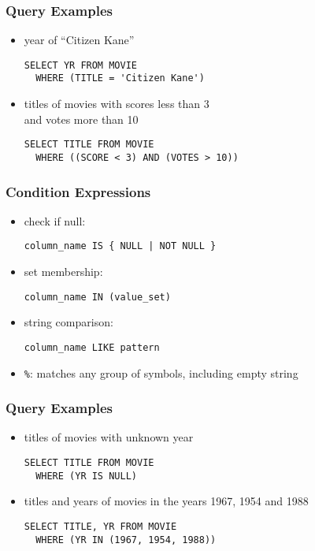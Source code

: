 \documentclass[dvipsnames]{beamer}
\theoremstyle{plain}
\begin{document}
\begin{frame}[fragile]
  \frametitle{Query Examples}

  \begin{itemize}
    \item year of ``Citizen Kane''
    \begin{lstlisting}
SELECT YR FROM MOVIE
  WHERE (TITLE = 'Citizen Kane')
    \end{lstlisting}

    \pause
    \item titles of movies with scores less than 3\\
      and votes more than 10
    \begin{lstlisting}
SELECT TITLE FROM MOVIE
  WHERE ((SCORE < 3) AND (VOTES > 10))
    \end{lstlisting}
  \end{itemize}
\end{frame}

\begin{frame}[fragile]
  \frametitle{Condition Expressions}

  \begin{itemize}
    \item check if null:\\
    \begin{lstlisting}
column_name IS { NULL | NOT NULL }
    \end{lstlisting}

    \pause
    \medskip
    \item set membership:\\
    \begin{lstlisting}
column_name IN (value_set)
    \end{lstlisting}

    \pause
    \medskip
    \item string comparison:
    \begin{lstlisting}
column_name LIKE pattern
    \end{lstlisting}
    \item \lstinline!%!: matches any group of symbols, including empty string
  \end{itemize}
\end{frame}

\begin{frame}[fragile]
  \frametitle{Query Examples}

  \begin{itemize}
    \item titles of movies with unknown year
    \begin{lstlisting}
SELECT TITLE FROM MOVIE
  WHERE (YR IS NULL)
    \end{lstlisting}

    \pause
    \item titles and years of movies in the years 1967, 1954 and 1988
    \begin{lstlisting}
SELECT TITLE, YR FROM MOVIE
  WHERE (YR IN (1967, 1954, 1988))
    \end{lstlisting}
  \end{itemize}
\end{frame}
\end{document}

